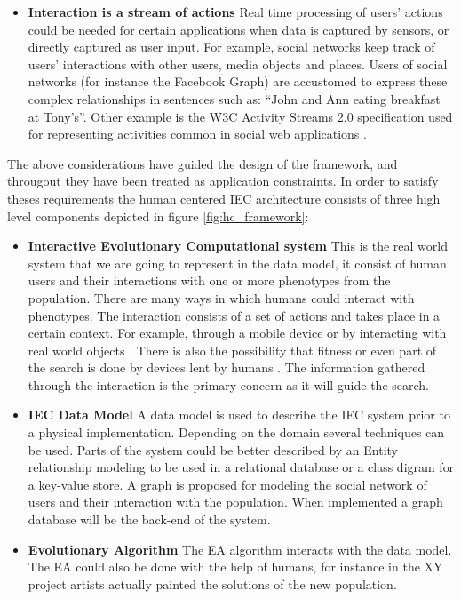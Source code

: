 \begin{itemize}
\item {\bf Interaction is a stream of actions}
  Real time processing of users' actions could be needed for certain applications when data is 
  captured by sensors, or directly captured as user input. For example, social networks keep track of 
  users' interactions with other users, media objects and places. Users of 
  social networks (for instance the Facebook Graph) are accustomed to express these 
  complex relationships in sentences such as: ``John and Ann eating breakfast at Tony's''. 
  Other example is the W3C Activity Streams 2.0 specification used for representing activities 
  common in social web applications \cite{json:streams}. 
\end{itemize}

The above considerations have guided the design of the framework, and througout they have been
treated as application constraints. In order to satisfy theses requirements the
human centered IEC architecture consists of three high level components depicted
in figure \ref{fig:hc_framework}:

\begin{itemize}
  \item {\bf Interactive Evolutionary Computational system} 
  This is the real world system that we are going to represent in the data model, 
  it consist of human users and their interactions with one or more phenotypes
  from the population. There are many ways in which humans could interact 
  with phenotypes. The interaction consists of a set of actions and 
  takes place in a certain context. For example, through a mobile device  
  or by interacting with real world objects 
  \cite{de2014artists,de2013unplugging}. 
  There is also the possibility that fitness or even part of the search 
  is done by devices lent by humans \cite{DBLP:conf/gecco/MereloCGCRV16}.
  The information gathered through the interaction is the primary concern
  as it will guide the search. 

  \item {\bf IEC Data Model}
  A data model is used to describe the IEC system prior to a physical 
  implementation.  Depending on the domain several techniques can be used.
  Parts of the system could be better described by an Entity relationship 
  modeling to be used in a relational database or a class digram for a 
  key-value store. A graph is proposed for modeling the social network of users 
  and their interaction with the population. When implemented a graph database 
  will be the back-end of the system. 

  \item {\bf Evolutionary Algorithm} 
  The EA algorithm interacts with the data model. The EA could also be done with the help of
  humans, for instance in the XY project \cite{de2013unplugging} artists actually painted
  the solutions of the new population.  
\end{itemize}

